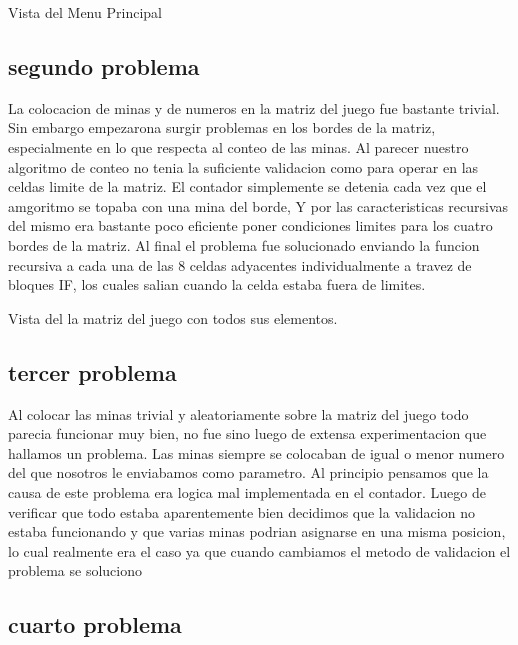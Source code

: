 \documentclass[11pt]{article} %
\begin{document}
\begin{center}
Vista del Menu Principal


\end{center}

\subsection{segundo problema}

La colocacion de minas y de numeros en la matriz del juego fue bastante trivial. Sin embargo empezarona  surgir problemas en los bordes de la matriz, especialmente en lo que respecta al conteo de las minas.
Al parecer nuestro algoritmo de conteo no tenia la suficiente validacion como para operar en las celdas limite de la matriz. El contador simplemente se detenia cada vez que el amgoritmo se topaba con una mina del borde, Y por las caracteristicas recursivas del mismo era bastante poco eficiente poner condiciones limites para los cuatro bordes de la matriz. Al final el problema fue solucionado enviando la funcion recursiva a cada una de las 8 celdas adyacentes individualmente a travez de bloques IF, los cuales salian cuando la celda estaba fuera de limites.


\begin{center}
Vista del la matriz del juego con todos sus elementos. 


\end{center}

\subsection{tercer problema }

Al colocar las minas trivial y aleatoriamente sobre la matriz del juego todo parecia funcionar muy bien, no fue sino luego de extensa experimentacion que hallamos un problema.
Las minas siempre se colocaban de igual o menor numero del que nosotros le enviabamos como parametro. Al principio pensamos que la causa de este problema era logica mal implementada en el contador. Luego de verificar que todo estaba aparentemente bien decidimos que la validacion no estaba funcionando y que varias minas podrian asignarse en una misma posicion, lo cual realmente era el caso ya que cuando cambiamos el metodo de validacion el problema se soluciono


\subsection{cuarto problema }
\end{document}
